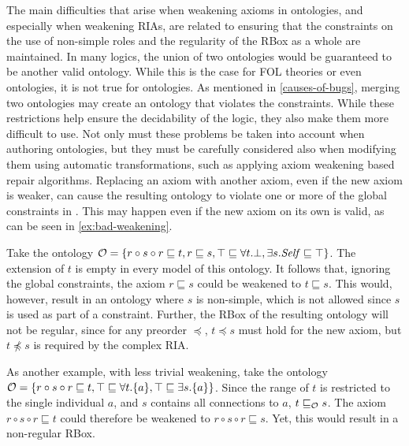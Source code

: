 
The main difficulties that arise when weakening axioms in \SROIQ ontologies, and especially when weakening RIAs, are related to ensuring that the constraints on the use of non-simple roles and the regularity of the RBox as a whole are maintained. In many logics, the union of two ontologies would be guaranteed to be another valid ontology. While this is the case for FOL theories or even \ALC ontologies, it is not true for \SROIQ ontologies. As mentioned in \cref{causes-of-bugs}, merging two \SROIQ ontologies may create an ontology that violates the constraints. While these restrictions help ensure the decidability of the logic, they also make them more difficult to use. Not only must these problems be taken into account when authoring ontologies, but they must be carefully considered also when modifying them using automatic transformations, such as applying axiom weakening based repair algorithms. Replacing an axiom with another axiom, even if the new axiom is weaker, can cause the resulting ontology to violate one or more of the global constraints in \SROIQ. This may happen even if the new axiom on its own is valid, as can be seen in \cref{ex:bad-weakening}.

\begin{example} \label{ex:bad-weakening}
  Take the ontology $\mathcal{O} = \{ r \circ s \circ r \sqsubseteq t, r \sqsubseteq s, \top \sqsubseteq \forall t.\bot, \exists s.\mathit{Self} \sqsubseteq \top \}$. The extension of $t$ is empty in every model of this ontology. It follows that, ignoring the global constraints, the axiom $r \sqsubseteq s$ could be weakened to $t \sqsubseteq s$. This would, however, result in an ontology where $s$ is non-simple, which is not allowed since $s$ is used as part of a \self constraint.
  Further, the RBox of the resulting ontology will not be regular, since for any preorder $\preceq$, $t \preceq s$ must hold for the new axiom, but $t \not\preceq s$ is required by the complex RIA.
\end{example}

\begin{example}
  As another example, with less trivial weakening, take the ontology $\mathcal{O} = \{ r \circ s \circ r \sqsubseteq t, \top \sqsubseteq \forall t.\{a\}, \top \sqsubseteq \exists s.\{a\} \}$. Since the range of $t$ is restricted to the single individual $a$, and $s$ contains all connections to $a$, $t \sqsubseteq_\mathcal{O} s$. The axiom $r \circ s \circ r \sqsubseteq t$ could therefore be weakened to $r \circ s \circ r \sqsubseteq s$. Yet, this would result in a non-regular RBox.
\end{example}

